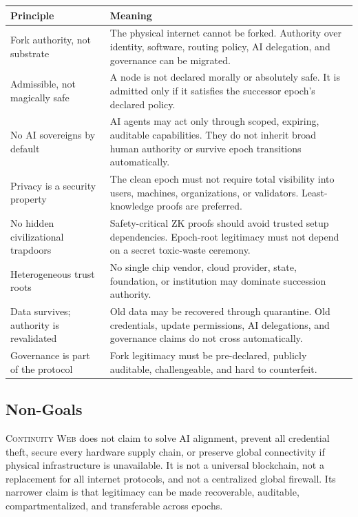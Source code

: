 \documentclass[11pt,letterpaper]{article}
\newcommand{\CW}{\textsc{Continuity Web}}
\begin{document}
\begin{longtable}{p{}p{}}
\toprule
\textbf{Principle} & \textbf{Meaning} \\
\midrule
Fork authority, not substrate & The physical internet cannot be forked. Authority over identity, software, routing policy, AI delegation, and governance can be migrated. \\
\addlinespace
Admissible, not magically safe & A node is not declared morally or absolutely safe. It is admitted only if it satisfies the successor epoch's declared policy. \\
\addlinespace
No AI sovereigns by default & AI agents may act only through scoped, expiring, auditable capabilities. They do not inherit broad human authority or survive epoch transitions automatically. \\
\addlinespace
Privacy is a security property & The clean epoch must not require total visibility into users, machines, organizations, or validators. Least-knowledge proofs are preferred. \\
\addlinespace
No hidden civilizational trapdoors & Safety-critical ZK proofs should avoid trusted setup dependencies. Epoch-root legitimacy must not depend on a secret toxic-waste ceremony. \\
\addlinespace
Heterogeneous trust roots & No single chip vendor, cloud provider, state, foundation, or institution may dominate succession authority. \\
\addlinespace
Data survives; authority is revalidated & Old data may be recovered through quarantine. Old credentials, update permissions, AI delegations, and governance claims do not cross automatically. \\
\addlinespace
Governance is part of the protocol & Fork legitimacy must be pre-declared, publicly auditable, challengeable, and hard to counterfeit. \\
\bottomrule
\end{longtable}

\subsection{Non-Goals}

\CW{} does not claim to solve AI alignment, prevent all credential theft, secure every hardware supply chain, or preserve global connectivity if physical infrastructure is unavailable. It is not a universal blockchain, not a replacement for all internet protocols, and not a centralized global firewall. Its narrower claim is that legitimacy can be made recoverable, auditable, compartmentalized, and transferable across epochs.
\end{document}
